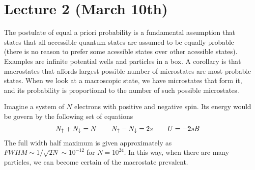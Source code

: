\section{Lecture 2 (March 10th)}
\begin{rmk}
The postulate of equal a priori probability is a fundamental assumption that states that all accessible quantum states are assumed to be equally probable (there is no reason to prefer some acessible states over other acessible states). Examples are infinite potential wells and particles in a box. A corollary is that macrostates that affords largest possible number of microstates are most probable states. When we look at a macroscopic state, we have microstates that form it, and its probability is proportional to the number of such possible microstates.
\end{rmk}
\vspace{2ex}
\begin{ex}
Imagine a system of $N$ electrons with positive and negative spin. Its energy would be govern by the following set of equations
\begin{align*}
N_{\uparrow}+N_{\downarrow}=N\hspace{5ex}N_{\uparrow}-N_{\downarrow}=2s\hspace{5ex}U=-2sB
\end{align*}
The full width half maximum is given approximately as $FWHM\sim 1/\sqrt{2N}\sim 10^{-12}$ for $N=10^{24}$. In this way, when there are many particles, we can become certain of the macrostate prevalent.
\end{ex}
\vspace{2ex}
